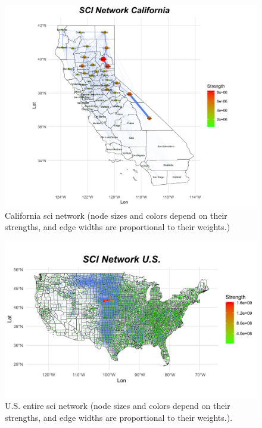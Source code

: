 \begin{figure}[h]
    \centering
    \begin{minipage}{0.7\textwidth}
        \includegraphics[width=\textwidth]{images/task43/California/network_California_strength.png}
    \end{minipage}%
    \begin{minipage}{0.3\textwidth}
        \caption{California sci network (node sizes and colors depend on their strengths, and edge widths are proportional to their weights.)}
        \label{California:strength}
    \end{minipage}
\end{figure}

\begin{figure}[h]
    \centering
    \begin{minipage}{0.7\textwidth}
        \includegraphics[width=\textwidth]{images/task43/U.S./US_network.png}
    \end{minipage}%
    \begin{minipage}{0.3\textwidth}
        \caption{U.S. entire sci network (node sizes and colors depend on their strengths, and edge widths are proportional to their weights.).}
        \label{fig:us_counties}
    \end{minipage}
\end{figure}



